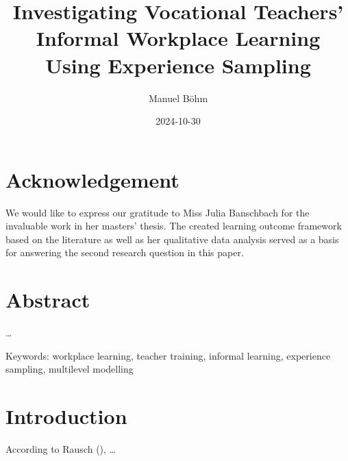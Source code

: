 \documentclass[
]{article}
\title{Investigating Vocational Teachers' Informal Workplace Learning
Using Experience Sampling}
\author{Manuel Böhm}
\date{2024-10-30}
\begin{document}
\maketitle

\renewcommand*\contentsname{Article Outline}
{
\setcounter{tocdepth}{2}
\tableofcontents
}
\newpage
{}

\section*{Acknowledgement}\label{acknowledgement}

We would like to express our gratitude to Miss Julia Banschbach for the
invaluable work in her masters' thesis. The created learning outcome
framework based on the literature as well as her qualitative data
analysis served as a basis for answering the second research question in
this paper.

\newpage

\section*{Abstract}\label{abstract}

\ldots{}

Keywords: workplace learning, teacher training, informal learning,
experience sampling, multilevel modelling

\newpage

\section{Introduction}\label{introduction}

According to Rausch
(), \ldots{}
\end{document}
